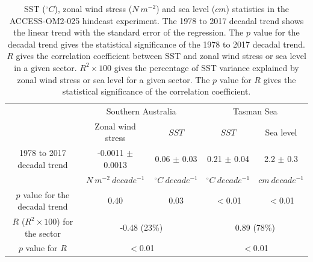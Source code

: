 \documentclass[draft,linenumbers]{agujournal2018}
\begin{document}
\begin{table}
\caption{SST ($^{\circ}C$), zonal wind stress ($N\ m^{-2}$) and sea level ($cm$) statistics in the ACCESS-OM2-025 hindcast experiment. The 1978 to 2017 decadal trend shows the linear trend with the standard error of the regression. The $p$ value for the decadal trend gives the statistical significance of the 1978 to 2017 decadal trend. $R$ gives the correlation coefficient between SST and zonal wind stress or sea level in a given sector. $R^2 \times 100$ gives the percentage of SST variance explained by zonal wind stress or sea level for a given sector. The $p$ value for $R$ gives the statistical significance of the correlation coefficient.}
\centering
\begin{tabular}{c c c c c}
\hline
  & \multicolumn{2}{c}{Southern Australia} & \multicolumn{2}{c}{Tasman Sea} \\
  & Zonal wind stress  & $SST$ & $SST$ & Sea level\\
\hline
  1978 to 2017 decadal trend & -0.0011 $\pm$ 0.0013 & 0.06 $\pm$ 0.03 & 0.21 $\pm$ 0.04 & 2.2 $\pm$ 0.3 \\
  & $N\ m^{-2}\ decade^{-1}$ & $^{\circ}C\ decade^{-1}$ & $^{\circ}C\ decade^{-1}$ & $cm\ decade^{-1}$ \\
  $p$ value for the decadal trend & 0.40 & 0.03 & $<$0.01 & $<$0.01 \\
  $R$ ($R^2 \times 100$) for the sector & \multicolumn{2}{c}{-0.48 (23\%)} & \multicolumn{2}{c}{0.89 (78\%)} \\
  $p$ value for $R$ & \multicolumn{2}{c}{$<$0.01} & \multicolumn{2}{c}{$<$0.01} \\
\hline
\end{tabular}
\label{Table3}
\end{table}
\end{document}
